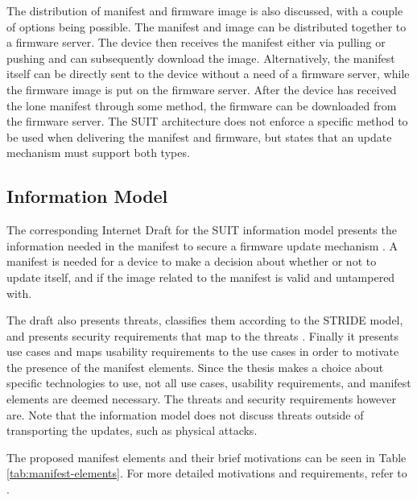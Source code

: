 \documentclass[0-thesis.tex]{subfiles}
\begin{document}
The distribution of manifest and firmware image is also discussed, with a couple of
options being possible. The manifest and image can be distributed together to a firmware
server. The device then receives the manifest either via pulling or pushing and can
subsequently download the image. Alternatively, the manifest itself can be directly sent
to the device without a need of a firmware server, while the firmware image is put on the
firmware server. After the device has received the lone manifest through some method, the
firmware can be downloaded from the firmware server. The SUIT architecture does not
enforce a specific method to be used when delivering the manifest and firmware, but states
that an update mechanism must support both types.


\subsection{Information Model}
\label{ssec:information-model}
The corresponding Internet Draft for the SUIT information model presents the information
needed in the manifest to secure a firmware update mechanism
\parencite{suit-information-model}. A manifest is needed for a device to make a decision
about whether or not to update itself, and if the image related to the manifest is valid
and untampered with.

The draft also presents threats, classifies them according to the STRIDE model, and
presents security requirements that map to the threats \parencite{stride}. Finally it
presents use cases and maps usability requirements to the use cases in order to motivate
the presence of the manifest elements. Since the thesis makes a choice about specific
technologies to use, not all use cases, usability requirements, and manifest elements are
deemed necessary. The threats and security requirements however are. Note that the
information model does not discuss threats outside of transporting the updates, such as
physical attacks.

The proposed manifest elements and their brief motivations can be seen in Table
\ref{tab:manifest-elements}. For more detailed motivations and requirements, refer to
\parencite{suit-information-model}.
\end{document}
